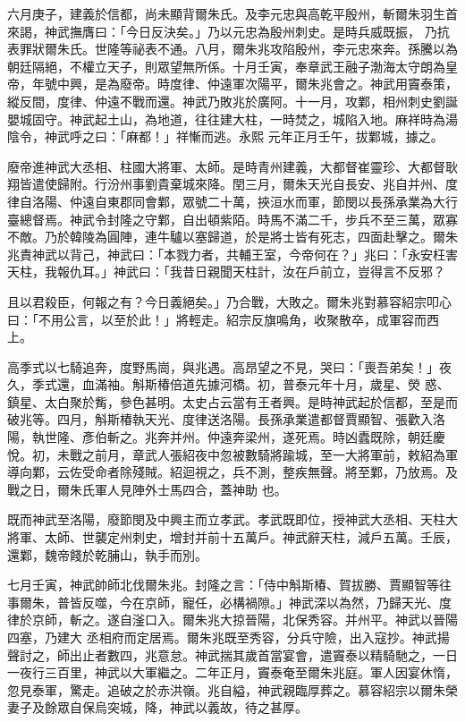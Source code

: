 \begin{pinyinscope}
 六月庚子，建義於信都，尚未顯背爾朱氏。及李元忠與高乾平殷州，斬爾朱羽生首來謁，神武撫膺曰：「今日反決矣。」乃以元忠為殷州刺史。是時兵威既振，
 乃抗表罪狀爾朱氏。世隆等祕表不通。八月，爾朱兆攻陷殷州，李元忠來奔。孫騰以為朝廷隔絕，不權立天子，則眾望無所係。十月壬寅，奉章武王融子渤海太守朗為皇帝，年號中興，是為廢帝。時度律、仲遠軍次陽平，爾朱兆會之。神武用竇泰策，縱反間，度律、仲遠不戰而還。神武乃敗兆於廣阿。十一月，攻鄴，相州刺史劉誕嬰城固守。神武起土山，為地道，往往建大柱，一時焚之，城陷入地。麻祥時為湯陰令，神武呼之曰：「麻都！」祥慚而逃。永熙
 元年正月壬午，拔鄴城，據之。



 廢帝進神武大丞相、柱國大將軍、太師。是時青州建義，大都督崔靈珍、大都督耿翔皆遣使歸附。行汾州事劉貴棄城來降。閏三月，爾朱天光自長安、兆自并州、度律自洛陽、仲遠自東郡同會鄴，眾號二十萬，挾洹水而軍，節閔以長孫承業為大行臺總督焉。神武令封隆之守鄴，自出頓紫陌。時馬不滿二千，步兵不至三萬，眾寡不敵。乃於韓陵為圓陣，連牛驢以塞歸道，於是將士皆有死志，四面赴擊之。爾朱
 兆責神武以背己，神武曰：「本戮力者，共輔王室，今帝何在？」兆曰：「永安枉害天柱，我報仇耳。」神武曰：「我昔日親聞天柱計，汝在戶前立，豈得言不反邪？



 且以君殺臣，何報之有？今日義絕矣。」乃合戰，大敗之。爾朱兆對慕容紹宗叩心曰：「不用公言，以至於此！」將輕走。紹宗反旗鳴角，收聚散卒，成軍容而西上。



 高季式以七騎追奔，度野馬崗，與兆遇。高昂望之不見，哭曰：「喪吾弟矣！」夜久，季式還，血滿袖。斛斯椿倍道先據河橋。初，普泰元年十月，歲星、熒
 惑、鎮星、太白聚於觜，參色甚明。太史占云當有王者興。是時神武起於信都，至是而破兆等。四月，斛斯椿執天光、度律送洛陽。長孫承業遣都督賈顯智、張歡入洛陽，執世隆、彥伯斬之。兆奔并州。仲遠奔梁州，遂死焉。時凶蠹既除，朝廷慶悅。初，未戰之前月，章武人張紹夜中忽被數騎將踰城，至一大將軍前，敕紹為軍導向鄴，云佐受命者除殘賊。紹迴視之，兵不測，整疾無聲。將至鄴，乃放焉。及戰之日，爾朱氏軍人見陣外士馬四合，蓋神助
 也。



 既而神武至洛陽，廢節閔及中興主而立孝武。孝武既即位，授神武大丞相、天柱大將軍、太師、世襲定州刺史，增封并前十五萬戶。神武辭天柱，減戶五萬。壬辰，還鄴，魏帝餞於乾脯山，執手而別。



 七月壬寅，神武帥師北伐爾朱兆。封隆之言：「侍中斛斯椿、賀拔勝、賈顯智等往事爾朱，普皆反噬，今在京師，寵任，必構禍隙。」神武深以為然，乃歸天光、度律於京師，斬之。遂自滏口入。爾朱兆大掠晉陽，北保秀容。并州平。神武以晉陽四塞，乃建大
 丞相府而定居焉。爾朱兆既至秀容，分兵守險，出入寇抄。神武揚聲討之，師出止者數四，兆意怠。神武揣其歲首當宴會，遣竇泰以精騎馳之，一日一夜行三百里，神武以大軍繼之。二年正月，竇泰奄至爾朱兆庭。軍人因宴休惰，忽見泰軍，驚走。追破之於赤洪嶺。兆自縊，神武親臨厚葬之。慕容紹宗以爾朱榮妻子及餘眾自保烏突城，降，神武以義故，待之甚厚。




\end{pinyinscope}
